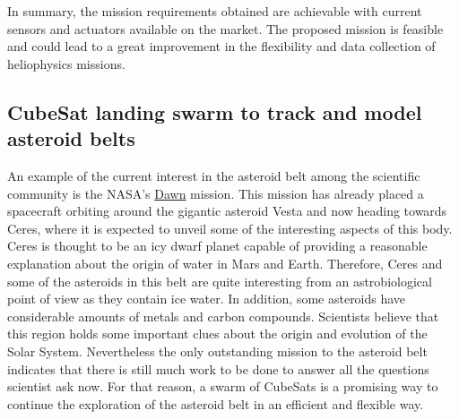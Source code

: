 In summary, the mission requirements obtained are achievable with current
sensors and actuators available on the market. The proposed mission
is feasible and could lead to a great improvement in the flexibility
and data collection of heliophysics missions.


\subsection{CubeSat landing swarm to track and model asteroid belts}
\label{ast_belt}
An example of the current interest in the asteroid belt among the
scientific community is the NASA's \href{http://dawn.jpl.nasa.gov/mission/journal.asp}{Dawn} mission.
This mission has already placed a spacecraft orbiting around the gigantic
asteroid Vesta and now heading towards Ceres, where it is expected
to unveil some of the interesting aspects of this body. Ceres is thought to be
an icy dwarf planet capable of providing a reasonable explanation about
the origin of water in Mars and Earth. Therefore, Ceres and some of
the asteroids in this belt are quite interesting from an astrobiological
point of view as they contain ice water. In addition, some asteroids
have considerable amounts of metals and carbon compounds. Scientists believe
that this region holds some important clues about the origin and evolution
of the Solar System. Nevertheless the only outstanding mission to
the asteroid belt indicates that there is still much work to be done to answer
all the questions scientist ask now. For that reason, a swarm of CubeSats
is a promising way to continue the exploration of the asteroid belt
in an efficient and flexible way.

